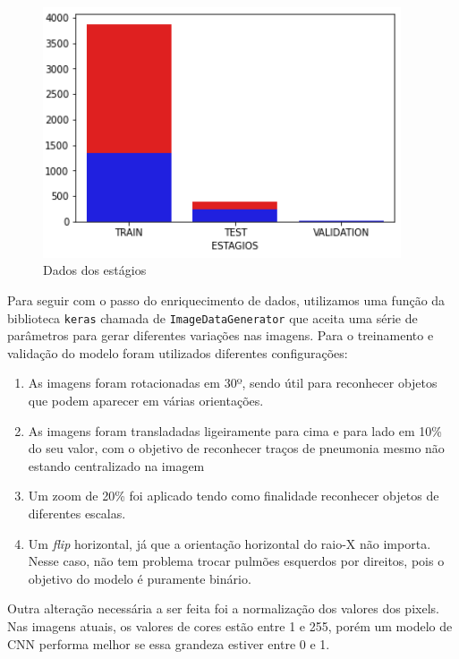 \begin{figure}[!ht]
    \begin{center}
    \includegraphics[width=300pt]{pictures/dados_estagios.png}
    \caption{Dados dos estágios}
    \label{pic:estagios_treinamento}
    \end{center}
\end{figure}

\newpage
Para seguir com o passo do enriquecimento de dados, utilizamos uma função da biblioteca \verb|keras| chamada de \verb|ImageDataGenerator| que aceita uma série de parâmetros para gerar diferentes variações nas imagens. Para o treinamento e validação do modelo foram utilizados diferentes configurações:

\begin{enumerate}
    \item As imagens foram rotacionadas em 30º, sendo útil para reconhecer objetos que podem aparecer em várias orientações.
    \item As imagens foram transladadas ligeiramente para cima e para lado em 10\% do seu valor, com o objetivo de reconhecer traços de pneumonia mesmo não estando centralizado na imagem
    \item Um zoom de 20\% foi aplicado tendo como finalidade reconhecer objetos de diferentes escalas.
    \item Um \textit{flip} horizontal, já que a orientação horizontal do raio-X não importa. Nesse caso, não tem problema trocar pulmões esquerdos por direitos, pois o objetivo do modelo é puramente binário.
\end{enumerate}

Outra alteração necessária a ser feita foi a normalização dos valores dos pixels. Nas imagens atuais, os valores de cores estão entre 1 e 255, porém um modelo de CNN performa melhor se essa grandeza estiver entre 0 e 1. 
\newpage 

